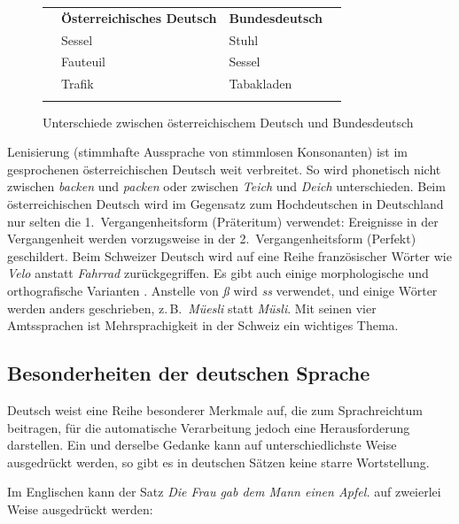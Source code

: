 \documentclass[]{../../metanetpaper}
\begin{document}
\begin{multicols}{2}
\begin{figure}[tb]
  \setlength{\tabcolsep}{3.3em}
  \begin{tabularx}{\textwidth}{llll} \toprule\addlinespace
    & \textbf{Österreichisches Deutsch} & \textbf{Bundesdeutsch} & \\ 
\addlinespace\midrule\addlinespace
    & Sessel   & Stuhl      & \\ 
    & Fauteuil & Sessel     & \\ 
    & Trafik   & Tabakladen & \\ \addlinespace\bottomrule
  \end{tabularx}
  \caption{Unterschiede zwischen österreichischem Deutsch und Bundesdeutsch}
  \label{atgetabelle_de}
\end{figure} 
Lenisierung (stimmhafte Aussprache von stimmlosen Konsonanten) ist im gesprochenen österreichischen Deutsch weit verbreitet. So wird phonetisch nicht zwischen \textit{backen} und \textit{packen} oder zwischen \textit{Teich} und \textit{Deich} unterschieden. Beim österreichischen Deutsch wird im Gegensatz zum Hochdeutschen in Deutschland nur selten die 1.~Vergangenheitsform (Präteritum) verwendet: Ereignisse in der Vergangenheit werden vorzugsweise in der 2.~Vergangenheitsform (Perfekt) geschildert. 
Beim Schweizer Deutsch wird auf eine Reihe französischer Wörter wie \textit{Velo} anstatt \textit{Fahrrad} zurückgegriffen. Es gibt auch einige morphologische und orthografische Varianten \cite{Cano1}. Anstelle von \textit{ß} wird \textit{ss} verwendet, und einige Wörter werden anders geschrieben, z.\,B.~\textit{Müesli} statt \textit{Müsli}. Mit seinen vier Amtssprachen ist Mehrsprachigkeit in der Schweiz ein wichtiges Thema.

\subsection{Besonderheiten der deutschen Sprache}

Deutsch weist eine Reihe besonderer Merkmale auf, die zum Sprachreichtum beitragen, für die automatische Verarbeitung jedoch eine Herausforderung darstellen. Ein und derselbe Gedanke kann auf unterschiedlichste Weise ausgedrückt werden, so gibt es in deutschen Sätzen keine starre Wortstellung.


Im Englischen kann der Satz \textit{Die Frau gab dem Mann einen Apfel.} auf zweierlei Weise ausgedrückt werden:


\end{multicols}
\end{document}
